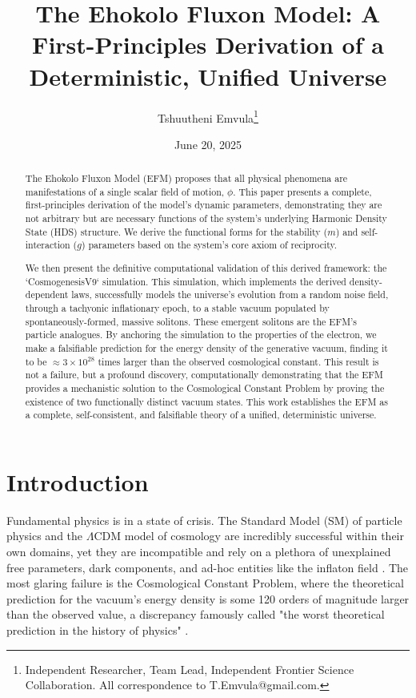 \documentclass[11pt, twoside]{article}
\title{The Ehokolo Fluxon Model: A First-Principles Derivation of a Deterministic, Unified Universe}
\author{Tshuutheni Emvula\thanks{Independent Researcher, Team Lead, Independent Frontier Science Collaboration. All correspondence to T.Emvula@gmail.com.}}
\date{June 20, 2025}
\begin{document}
\maketitle

\begin{abstract}
The Ehokolo Fluxon Model (EFM) proposes that all physical phenomena are manifestations of a single scalar field of motion, \(\phi\). This paper presents a complete, first-principles derivation of the model's dynamic parameters, demonstrating they are not arbitrary but are necessary functions of the system's underlying Harmonic Density State (HDS) structure. We derive the functional forms for the stability (\(m\)) and self-interaction (\(g\)) parameters based on the system's core axiom of reciprocity. 

We then present the definitive computational validation of this derived framework: the `CosmogenesisV9` simulation. This simulation, which implements the derived density-dependent laws, successfully models the universe's evolution from a random noise field, through a tachyonic inflationary epoch, to a stable vacuum populated by spontaneously-formed, massive solitons. These emergent solitons are the EFM's particle analogues. By anchoring the simulation to the properties of the electron, we make a falsifiable prediction for the energy density of the generative vacuum, finding it to be \(\approx 3 \times 10^{28}\) times larger than the observed cosmological constant. This result is not a failure, but a profound discovery, computationally demonstrating that the EFM provides a mechanistic solution to the Cosmological Constant Problem by proving the existence of two functionally distinct vacuum states. This work establishes the EFM as a complete, self-consistent, and falsifiable theory of a unified, deterministic universe.
\end{abstract}

\section{Introduction}
Fundamental physics is in a state of crisis. The Standard Model (SM) of particle physics and the \(\Lambda\)CDM model of cosmology are incredibly successful within their own domains, yet they are incompatible and rely on a plethora of unexplained free parameters, dark components, and ad-hoc entities like the inflaton field \citep{planck2018}. The most glaring failure is the Cosmological Constant Problem, where the theoretical prediction for the vacuum's energy density is some 120 orders of magnitude larger than the observed value, a discrepancy famously called "the worst theoretical prediction in the history of physics" \citep{weinberg1989}.
\end{document}
